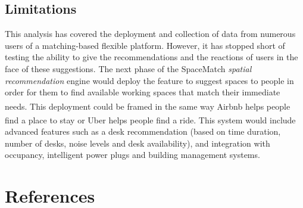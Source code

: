 \documentclass[]{interact}
\theoremstyle{plain}%
\theoremstyle{definition}
\theoremstyle{remark}
\begin{document}
\subsection{Limitations}
This analysis has covered the deployment and collection of data from numerous users of a matching-based flexible platform. However, it has stopped short of testing the ability to give the recommendations and the reactions of users in the face of these suggestions. The next phase of the SpaceMatch \emph{spatial recommendation} engine would deploy the feature to suggest spaces to people in order for them to find available working spaces that match their immediate needs. This deployment could be framed in the same way Airbnb\textsuperscript{\textregistered} helps people find a place to stay or Uber\textsuperscript{\textregistered} helps people find a ride. This system would include advanced features such as a desk recommendation (based on time duration, number of desks, noise levels and desk availability), and integration with occupancy, intelligent power plugs and building management systems. 








% 
%
%

\section*{References}
   
  
\end{document}
